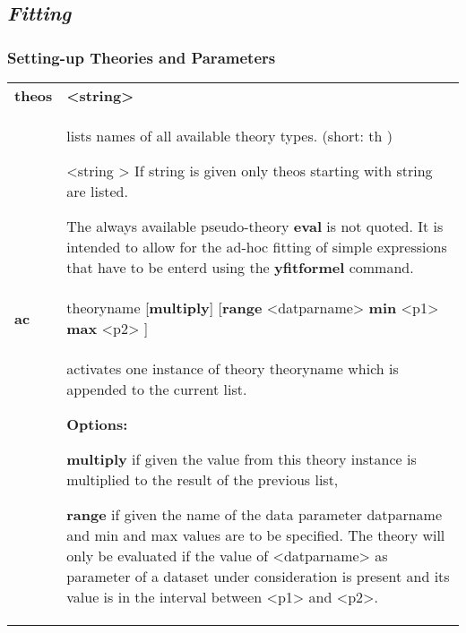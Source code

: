 \documentclass[]{article}
\begin{document}
\hypertarget{fitting}{%
\subsection{\texorpdfstring{\emph{Fitting}}{Fitting}}\label{fitting}}

\hypertarget{setting-up-theories-and-parameters}{%
\subsubsection{Setting-up Theories and
Parameters}\label{setting-up-theories-and-parameters}}

\begin{longtable}[]{@{}ll@{}}
\toprule
\endhead
\textbf{theos} & \textbf{\textless{}string\textgreater{}}\tabularnewline
\begin{minipage}[t]{0.47\columnwidth}\raggedright
\strut
\end{minipage} & \begin{minipage}[t]{0.47\columnwidth}\raggedright
lists names of all available theory types. (short: th )

\textless{}string \textgreater{} If string is given only theos starting
with string are listed.

The always available pseudo-theory \textbf{eval} is not quoted. It is
intended to allow for the ad-hoc fitting of simple expressions that have
to be enterd using the \textbf{yfitformel} command.\strut
\end{minipage}\tabularnewline
\textbf{ac} & theoryname {[}\textbf{multiply}{]} {[}\textbf{range}
\textless{}datparname\textgreater{} \textbf{min}
\textless{}p1\textgreater{} \textbf{max} \textless{}p2\textgreater{}
{]}\tabularnewline
\begin{minipage}[t]{0.47\columnwidth}\raggedright
\strut
\end{minipage} & \begin{minipage}[t]{0.47\columnwidth}\raggedright
activates one instance of theory theoryname which is appended to the
current list.

\textbf{Options:}

\textbf{multiply} if given the value from this theory instance is
multiplied to the result of the previous list,

\textbf{range} if given the name of the data parameter datparname and
min and max values are to be specified. The theory will only be
evaluated if the value of \textless{}datparname\textgreater{} as
parameter of a dataset under consideration is present and its value is
in the interval between \textless{}p1\textgreater{} and
\textless{}p2\textgreater{}.


\end{minipage}
\end{longtable}
\end{document}
